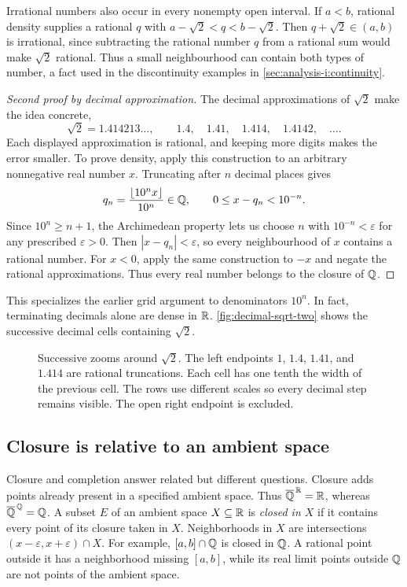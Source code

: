 Irrational numbers also occur in every nonempty open interval. If $a<b$,
rational density supplies a rational $q$ with
$a-\sqrt2<q<b-\sqrt2$. Then $q+\sqrt2\in(a,b)$ is irrational,
since subtracting the rational number $q$ from a rational sum would
make $\sqrt2$ rational. Thus a small neighbourhood can contain both
types of number, a fact used in the discontinuity examples in
\autoref{sec:analysis-i:continuity}.



\begin{proof}[Second proof by decimal approximation]
  The decimal approximations of $\sqrt2$ make the idea concrete,
  \[
    \sqrt2=1.414213\ldots,\qquad
    1.4,\quad 1.41,\quad 1.414,\quad 1.4142,\quad\ldots.
  \]
  Each displayed approximation is rational, and keeping more digits
  makes the error smaller. To prove density, apply this construction
  to an arbitrary nonnegative real number $x$. Truncating after $n$
  decimal places gives
  \[
    q_n=\frac{\lfloor10^n x\rfloor}{10^n}\in\mathbb{Q},
    \qquad 0\le x-q_n<10^{-n}.
  \]
  Since $10^n\ge n+1$, the Archimedean property lets us choose $n$
  with $10^{-n}<\varepsilon$ for any prescribed $\varepsilon>0$.
  Then $|x-q_n|<\varepsilon$, so every neighbourhood of $x$ contains
  a rational number. For $x<0$, apply the same construction to $-x$
  and negate the rational approximations. Thus every real number
  belongs to the closure of $\mathbb{Q}$.
\end{proof}
This specializes the earlier grid argument to denominators $10^n$.
In fact, terminating decimals alone are dense in $\mathbb{R}$.
\autoref{fig:decimal-sqrt-two} shows the successive decimal cells
containing $\sqrt2$.


\begin{figure}[htbp]
  \centering
  
  \caption[Decimal approximations of the square root of two.]{%
    Successive zooms around $\sqrt2$. The left
    endpoints $1$, $1.4$, $1.41$, and $1.414$ are rational
    truncations. Each cell has one tenth the width of the previous
    cell. The rows use different scales so every decimal step remains
    visible. The open right endpoint is excluded.}
  \label{fig:decimal-sqrt-two}
\end{figure}

\subsection{Closure is relative to an ambient space}
Closure and completion answer related but different questions. Closure
adds points already present in a specified ambient space. Thus
$\overline{\mathbb{Q}}^{\,\mathbb{R}}=\mathbb{R}$, whereas $\overline{\mathbb{Q}}^{\,\mathbb{Q}}=\mathbb{Q}$.
A subset $E$ of an ambient space $X\subseteq\mathbb{R}$ is \emph{closed in $X$}
if it contains every point of its closure taken in $X$. Neighborhoods
in $X$ are intersections $(x-\varepsilon,x+\varepsilon)\cap X$.
For example, $[a,b]\cap\mathbb{Q}$ is closed in $\mathbb{Q}$. A rational point outside
it has a neighborhood missing $[a,b]$, while its real limit points
outside $\mathbb{Q}$ are not points of the ambient space.

